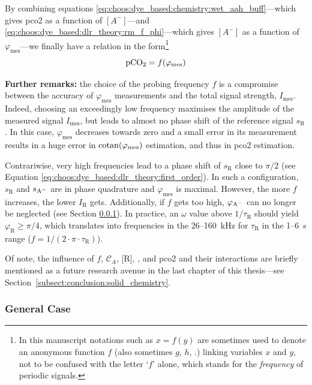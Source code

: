 By combining equations \ref{eq:choos:dye_based:chemistry:wet_aah_buff}---which gives \gls{pco2} as a function of $[A^-]$---and \ref{eq:choos:dye_based:dlr_theory:rm_f_phi}---which gives $[A^-]$ as a function of $\varphi_\text{mes}$---we finally have a relation in the form\footnote{In this manuscript notations such as $x=f(y)$ are sometimes used to denote an anonymous function $f$ (also sometimes $g$, $h$, \etc.) linking variables $x$ and $y$, not to be confused with the letter `$f$' alone, which stands for the \emph{frequency} of periodic signals.}
\begin{equation}
	\ce{pCO_2} = f(\varphi_\text{mes})
\end{equation}

\textbf{Further remarks:} the choice of the probing frequency $f$ is a compromise between the accuracy of $\varphi_\text{mes}$ measurements and the total signal strength, $I_\text{mes}$. Indeed, choosing an exceedingly low frequency maximises the amplitude of the measured signal $I_\text{mes}$, but leads to almost no phase shift of the reference signal $s_\mathrm{R}$. In this case, $\varphi_\text{mes}$ decreases towards zero and a small error in its measurement results in a huge error in $\operatorname{cotan}(\varphi_\text{mes})$ estimation, and thus in \gls{pco2} estimation.

Contrariwise, very high frequencies lead to a phase shift of $s_\mathrm{R}$ close to $\pi/2$ (see Equation \ref{eq:choos:dye_based:dlr_theory:first_order}). In such a configuration, $s_\mathrm{R}$ and $s_\mathrm{A^{\smash{-}}}$ are in phase quadrature and $\varphi_\text{mes}$ is maximal. However, the more $f$ increases, the lower $I_\mathrm{R}$ gets. Additionally, if $f$ gets too high, $\varphi_\mathrm{A^{\smash{-}}}$ can no longer be neglected (see Section \ref{subsect:choos:dye_based:dlr_theory:general_case}). In practice, an $\omega$ value above $1/\tau_\mathrm{R}$ should yield $\varphi_\mathrm{R} \geq \pi/4$, which translates into frequencies in the 26--160~kHz for $\tau_\mathrm{R}$ in the 1--6~\textmu{}s range ($f=1/(2\cdot \pi \cdot \tau_\mathrm{R})$).

Of note, the influence of $f$, $\mathcal{C}_{A}$, [R], \ce{[Q^+]}, and \gls{pco2} and their interactions are briefly mentioned as a future research avenue in the last chapter of this thesis---see Section~\ref{subsect:conclusion:solid_chemistry}.

\subsubsection{General Case}\label{subsect:choos:dye_based:dlr_theory:general_case}

